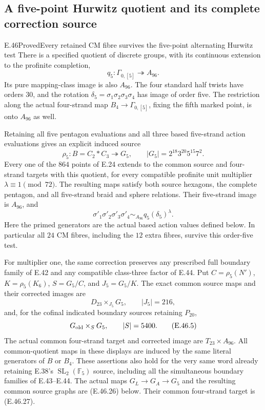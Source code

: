 \subsection{A five-point Hurwitz quotient and its complete correction source}

\begin{statement}{E.46}{Proved}{Every retained CM fibre survives the five-point alternating Hurwitz test}
There is a specified quotient of discrete groups, with its continuous
extension to the profinite completion,
\[
 q_5:\Gamma_{0,[5]}\twoheadrightarrow A_{96}.
 \tag{E.46.1}
\]
Its pure mapping-class image is also $A_{96}$.  The four standard
half twists have orders $30$, and the rotation
$\delta_5=\sigma_1\sigma_2\sigma_3\sigma_4$ has image of order five.
The restriction along the actual four-strand map
$B_4\to\Gamma_{0,[5]}$, fixing the fifth marked point, is onto
$A_{96}$ as well.

Retaining all five pentagon evaluations and all three based
five-strand action evaluations gives an explicit induced source
\[
 \rho_5:B=C_2*C_3\twoheadrightarrow G_5,
       \qquad |G_5|=2^{18}3^{20}5^{15}7^2.
 \tag{E.46.2}
\]
Every one of the $864$ points of E.24 extends to the common source
and four-strand targets with this quotient, for every compatible
profinite unit multiplier $\lambda\equiv1\pmod{72}$.
The resulting maps satisfy both source hexagons, the complete
pentagon, and all five-strand braid and sphere relations.
Their five-strand image is $A_{96}$, and
\[
 \sigma'_1\sigma'_2\sigma'_3\sigma'_4
             \sim_{A_{96}} q_5(\delta_5)^\lambda.
 \tag{E.46.3}
\]
Here the primed generators are the actual based action values
defined below.  In particular all $24$ CM fibres, including the
$12$ extra fibres, survive this order-five test.

For multiplier one, the same correction preserves any prescribed
full boundary family of E.42 and any compatible class-three factor
of E.44.  Put $C=\rho_5(N')$, $K=\rho_5(K_6)$, $S=G_5/C$,
and $J_5=G_5/K$.  The exact common source maps and their corrected
images are
\[
 D_{23}\times_{J_5}G_5,
       \qquad |J_5|=216,
 \tag{E.46.4}
\]
and, for the cofinal indicated boundary sources retaining $P_{20}$,
\[
                 G_{\rm old}\times_S G_5,
                 \qquad |S|=5400.
 \tag{E.46.5}
\]
The actual common four-strand target and corrected image are
$T_{23}\times A_{96}$.
All common-quotient maps in these displays are induced by the
same literal generators of $B$ or $B_4$.
These assertions also hold for the very same word already
retaining E.38's $\operatorname{SL}_2(\mathbb F_5)$ source,
including all the simultaneous boundary families of E.43--E.44.
The actual maps $G_L\to G_A\to G_5$ and the resulting common
source graphs are \textup{(E.46.26)} below.  Their common
four-strand target is \textup{(E.46.27)}.
\end{statement}

